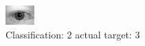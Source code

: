 \begin{figure}[h!]
\begin{center}
\includegraphics[width=0.60\columnwidth]{figures/ID642_class_2_target_3.png}
\end{center}
\caption{ Classification: 2 actual target: 3}
\label{fig:ID642_class_2_target_3}
\end{figure}
